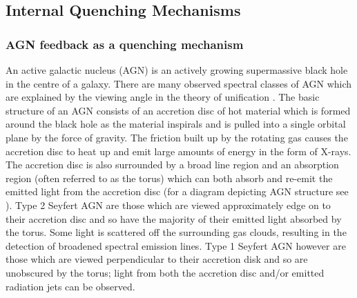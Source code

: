 \subsection{Internal Quenching Mechanisms}\label{sec:intquench}

\subsubsection{AGN feedback as a quenching mechanism}\label{sec:agnquench}

An active galactic nucleus (AGN) is an actively growing supermassive black hole in the centre of a galaxy. There are many observed spectral classes of AGN which are explained by the viewing angle in the theory of unification \citep[see review by][]{netzer15}. The basic structure of an AGN consists of an accretion disc of {\minor hot} material which is formed around the black hole as the material inspirals and is pulled into a single orbital plane by the force of gravity. The friction built up by the rotating gas causes the accretion disc to heat up and emit large amounts of energy in the form of X-rays. The accretion disc is also surrounded by a broad line region and an absorption region (often referred to as the torus) which can both absorb and re-emit the emitted light from the accretion disc (for a diagram depicting AGN structure see \citealt{beckmann12}). Type 2 Seyfert AGN are those which are viewed approximately edge on to their accretion disc and so have the majority of their emitted light absorbed by the torus. Some light is scattered off the surrounding gas clouds, resulting in the detection of broadened spectral emission lines. Type 1 Seyfert AGN however are those which are viewed perpendicular to their accretion disk and so are unobscured by the torus; light from both the accretion disc and/or emitted radiation jets can be observed. 


